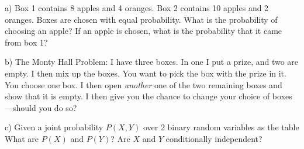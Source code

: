 

\renewcommand{\course}{Robotics}
\renewcommand{\coursepicture}{roboticsLecture}
\renewcommand{\coursedate}{Winter 2014}
\renewcommand{\exnum}{8}

\exercises


a) Box 1 contains 8 apples and 4 oranges. Box 2 contains 10 apples and 2
oranges. Boxes are chosen with equal probability. What is the
probability of choosing an apple? If an apple is chosen, what is the
probability that it came from box 1?

b) The Monty Hall Problem: I have three boxes. In one I put a prize,
and two are empty. I then mix up the boxes. You want to pick the box
with the prize in it. You choose one box. I then open \emph{another}
one of the two remaining boxes and show that it is empty. I then give
you the chance to change your choice of boxes---should you do so?

c) Given a joint probability $P(X,Y)$ over 2 binary random variables
as the table\\
What are $P(X)$ and $P(Y)$? Are $X$ and $Y$ conditionally independent?






